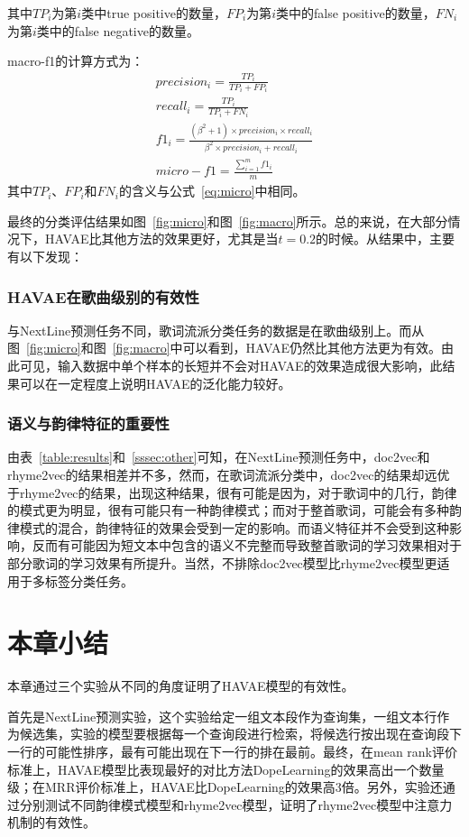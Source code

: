其中$TP_i$为第$i$类中true positive的数量，$FP_i$为第$i$类中的false positive的数量，$FN_i$为第$i$类中的false negative的数量。\par
macro-f1的计算方式为：
\begin{equation}
  \begin{gathered}
    precision_i = \frac{TP_i}{TP_i + FP_i}\\
    recall_i = \frac{TP_i}{TP_i + FN_i}\\
    f1_i = \frac{(\beta^2 + 1) \times precision_{i} \times recall_{i}}{\beta^2 \times precision_{i} + recall_{i}}\\
    micro-f1 = \frac{\sum_{i=1}^mf1_i}{m}
  \end{gathered}
\end{equation}
其中$TP_i$、$FP_i$和$FN_i$的含义与公式~\ref{eq:micro}中相同。\par

最终的分类评估结果如图~\ref{fig:micro}和图~\ref{fig:macro}所示。总的来说，在大部分情况下，HAVAE比其他方法的效果更好，尤其是当$t=0.2$的时候。从结果中，主要有以下发现：
\subsubsection{HAVAE在歌曲级别的有效性} 与NextLine预测任务不同，歌词流派分类任务的数据是在歌曲级别上。而从图~\ref{fig:micro}和图~\ref{fig:macro}中可以看到，HAVAE仍然比其他方法更为有效。由此可见，输入数据中单个样本的长短并不会对HAVAE的效果造成很大影响，此结果可以在一定程度上说明HAVAE的泛化能力较好。\par

\subsubsection{语义与韵律特征的重要性} 由表~\ref{table:results}和~\ref{sssec:other}可知，在NextLine预测任务中，doc2vec和rhyme2vec的结果相差并不多，然而，在歌词流派分类中，doc2vec的结果却远优于rhyme2vec的结果，出现这种结果，很有可能是因为，对于歌词中的几行，韵律的模式更为明显，很有可能只有一种韵律模式；而对于整首歌词，可能会有多种韵律模式的混合，韵律特征的效果会受到一定的影响。而语义特征并不会受到这种影响，反而有可能因为短文本中包含的语义不完整而导致整首歌词的学习效果相对于部分歌词的学习效果有所提升。当然，不排除doc2vec模型比rhyme2vec模型更适用于多标签分类任务。\par

\section{本章小结}
本章通过三个实验从不同的角度证明了HAVAE模型的有效性。\par
首先是NextLine预测实验，这个实验给定一组文本段作为查询集，一组文本行作为候选集，实验的模型要根据每一个查询段进行检索，将候选行按出现在查询段下一行的可能性排序，最有可能出现在下一行的排在最前。最终，在mean rank评价标准上，HAVAE模型比表现最好的对比方法DopeLearning的效果高出一个数量级；在MRR评价标准上，HAVAE比DopeLearning的效果高3倍。另外，实验还通过分别测试不同韵律模式模型和rhyme2vec模型，证明了rhyme2vec模型中注意力机制的有效性。\par

